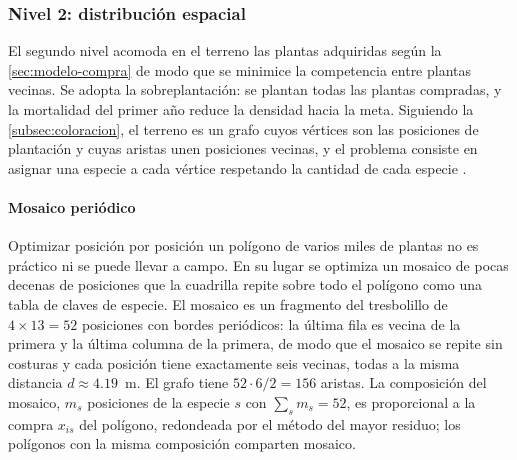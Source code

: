 \subsubsection{Nivel 2: distribución espacial}
\label{sec:modelo-espacial}

El segundo nivel acomoda en el terreno las plantas adquiridas según la \cref{sec:modelo-compra} de modo que se minimice la competencia entre plantas vecinas. Se adopta la sobreplantación: se plantan todas las plantas compradas, y la mortalidad del primer año reduce la densidad hacia la meta. Siguiendo la \cref{subsec:coloracion}, el terreno es un grafo cuyos vértices son las posiciones de plantación y cuyas aristas unen posiciones vecinas, y el problema consiste en asignar una especie a cada vértice respetando la cantidad de cada especie \autocite{elizalde2025,eisenblatter2002}.

\label{subsec:espacial-mosaico}

\paragraph{Mosaico periódico} Optimizar posición por posición un polígono de varios miles de plantas no es práctico ni se puede llevar a campo. En su lugar se optimiza un mosaico de pocas decenas de posiciones que la cuadrilla repite sobre todo el polígono como una tabla de claves de especie. El mosaico es un fragmento del tresbolillo de $4\times13=52$ posiciones con bordes periódicos: la última fila es vecina de la primera y la última columna de la primera, de modo que el mosaico se repite sin costuras y cada posición tiene exactamente seis vecinas, todas a la misma distancia $d\approx4.19$~m. El grafo tiene $52\cdot6/2=156$ aristas. La composición del mosaico, $m_s$ posiciones de la especie $s$ con $\sum_sm_s=52$, es proporcional a la compra $x_{is}$ del polígono, redondeada por el método del mayor residuo; los polígonos con la misma composición comparten mosaico.

